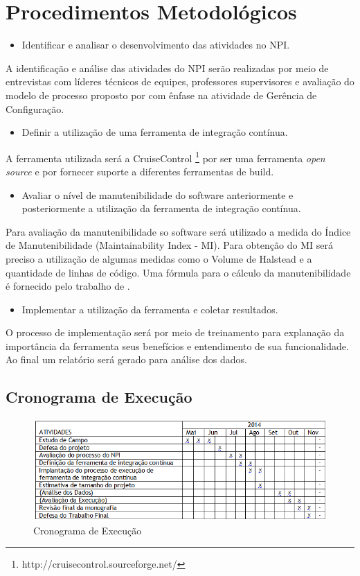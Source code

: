\chapter{Procedimentos Metodológicos}\label{metodologia}

\begin{itemize}
\item Identificar e analisar o desenvolvimento das atividades no NPI.
\end{itemize}
A identificação e análise das atividades do NPI serão realizadas por meio de entrevistas com líderes técnicos de equipes, professores supervisores e avaliação do modelo de processo proposto por  com ênfase na atividade de Gerência de Configuração.

\begin{itemize}
\item Definir a utilização de uma ferramenta de integração contínua.
\end{itemize}
A ferramenta utilizada será a CruiseControl \footnote{http://cruisecontrol.sourceforge.net/} por ser uma ferramenta \textit{open source} e por fornecer suporte a diferentes ferramentas de build.

\begin{itemize}
\item Avaliar o nível de manutenibilidade do software anteriormente e posteriormente a utilização da ferramenta de integração contínua.
\end{itemize}
Para avaliação da manutenibilidade so software será utilizado a medida do Índice de Manutenibilidade (Maintainability Index - MI). Para obtenção do MI será preciso a utilização de algumas medidas como o Volume de Halstead e a quantidade de linhas de código. Uma fórmula para o cálculo da manutenibilidade é fornecido pelo trabalho de .
\begin{itemize}

\item Implementar a utilização da ferramenta e coletar resultados.
\end{itemize}
O processo de implementação será por meio de treinamento para explanação da importância da ferramenta seus benefícios e entendimento de sua funcionalidade. Ao final um relatório será gerado para análise dos dados.





\section{Cronograma de Execução}
\begin{figure}[tbh]
\centering
\includegraphics[width=0.9\linewidth]{./images/cronograma}
\caption[Cronograma de Execução]{Cronograma de Execução}
\label{fig:Cronograma}
\end{figure}